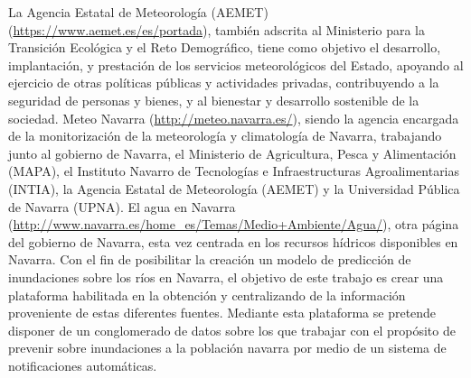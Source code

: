 \newline
La Agencia Estatal de Meteorología (AEMET) (\url{https://www.aemet.es/es/portada}), también adscrita al Ministerio para la Transición Ecológica y el Reto Demográfico, tiene como objetivo el desarrollo, implantación, y prestación de los servicios meteorológicos del Estado, apoyando al ejercicio de otras políticas públicas y actividades privadas, contribuyendo a la seguridad de personas y bienes, y al bienestar y desarrollo sostenible de la sociedad.\newline
\newline
Meteo Navarra (\url{http://meteo.navarra.es/}), siendo la agencia encargada de la  monitorización de la meteorología y climatología de Navarra, trabajando junto al gobierno de Navarra, el Ministerio de Agricultura, Pesca y Alimentación (MAPA), el Instituto Navarro de Tecnologías e Infraestructuras Agroalimentarias (INTIA), la Agencia Estatal de Meteorología (AEMET) y la Universidad Pública de Navarra (UPNA).\newline
\newline
El agua en Navarra (\url{http://www.navarra.es/home_es/Temas/Medio+Ambiente/Agua/}), otra página del gobierno de Navarra, esta vez centrada en los recursos hídricos disponibles en Navarra.\newline
\newline
Con el fin de posibilitar la creación un modelo de predicción de inundaciones sobre los ríos en Navarra, el objetivo de este trabajo es crear una plataforma habilitada en la obtención y centralizando de la información proveniente de estas diferentes fuentes. Mediante esta plataforma se pretende disponer de un conglomerado de datos sobre los que trabajar con el propósito de prevenir sobre inundaciones a la población navarra por medio de un sistema de notificaciones automáticas.


